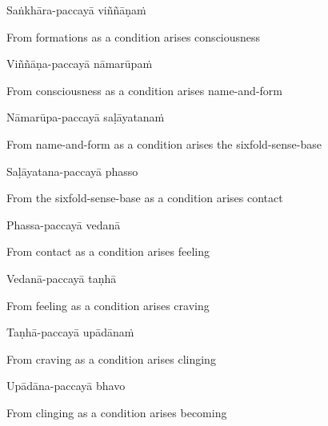 Saṅkhāra-paccayā viññāṇaṁ

\begin{english}
  From formations as a condition arises consciousness
\end{english}

Viññāṇa-paccayā nāmarūpaṁ

\begin{english}
  From consciousness as a condition arises name-and-form\makeatletter\hyperlink{endnote74-appendix}\makeatother
\end{english}

Nāmarūpa-paccayā saḷāyatanaṁ

\begin{english}
  From name-and-form as a condition arises the sixfold-sense-base
\end{english}

Saḷāyatana-paccayā phasso

\begin{english}
  From the sixfold-sense-base as a condition arises contact
\end{english}

Phassa-paccayā vedanā

\begin{english}
  From contact as a condition arises feeling
\end{english}

Vedanā-paccayā taṇhā

\begin{english}
  From feeling as a condition arises craving
\end{english}

Taṇhā-paccayā upādānaṁ

\begin{english}
  From craving as a condition arises clinging
\end{english}

Upādāna-paccayā bhavo

\begin{english}
  From clinging as a condition arises becoming
\end{english}

